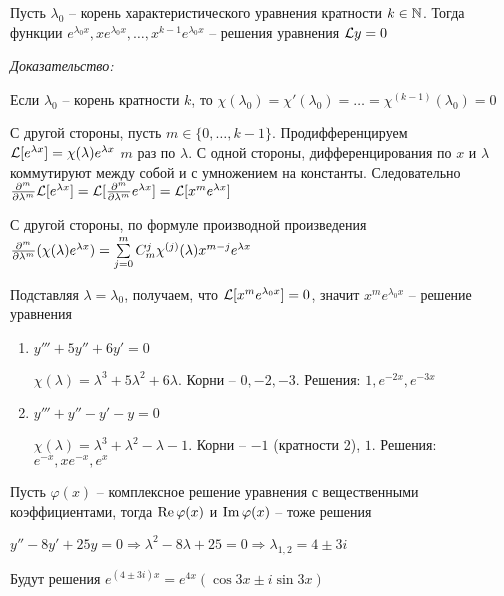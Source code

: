 \documentclass[12pt]{article}
\begin{document}
\begin{theo}{}
    Пусть $\lambda_0$ -- корень характеристического уравнения кратности $k \in \mathbb N$. Тогда функции $e^{\lambda_0x}, xe^{\lambda_0x}, \ldots, x^{k - 1}e^{\lambda_0x}$ -- решения уравнения $\mathcal{L} y = 0$ 
\end{theo}

\textit{Доказательство:}

Если $\lambda_0$ -- корень кратности $k$, то $\chi(\lambda_0) = \chi'(\lambda_0) = \ldots = \chi^{(k - 1)}(\lambda_0) = 0$

С другой стороны, пусть $m \in \{0, \ldots, k - 1\}$. Продифференцируем $\mathcal{L}[e^{\lambda x}] = \chi(\lambda)e^{\lambda x}$ $m$ раз по $\lambda$. С одной стороны, дифференцирования по $x$ и $\lambda$ коммутируют между собой и с умножением на константы. Следовательно $\frac{\partial ^m}{\partial \lambda^m}\mathcal{L}[e^{\lambda x}] = \mathcal{L}[\frac{\partial ^m}{\partial \lambda^m}e^{\lambda x}] = \mathcal{L}[x^me^{\lambda x}]$

С другой стороны, по формуле производной произведения $\frac{\partial ^m}{\partial \lambda^m}(\chi(\lambda)e^{\lambda x}) = \sum\limits_{j = 0}^m C_m^j\chi^{(j)}(\lambda) x^{m - j}e^{\lambda x}$

Подставляя $\lambda = \lambda_0$, получаем, что $\mathcal{L}[x^me^{\lambda_0x}] = 0$, значит $x^me^{\lambda_0x}$ -- решение уравнения

\begin{Example}{}
    \begin{enumerate}
        \item $y''' + 5y'' + 6y' = 0$
        
        $\chi(\lambda) = \lambda^3 + 5\lambda^2 + 6\lambda$. Корни -- $0, -2, -3$. Решения: $1, e^{-2x}, e^{-3x}$

        \item $y''' + y'' - y' - y = 0$
        
        $\chi(\lambda) = \lambda^3 + \lambda^2 - \lambda - 1$. Корни -- $-1$ (кратности 2), $1$. Решения: $e^{-x}, xe^{-x}, e^x$
    \end{enumerate}
\end{Example}

\begin{lem}{}
    Пусть $\varphi(x)$ -- комплексное решение уравнения с вещественными коэффициентами, тогда $\operatorname{Re} \varphi(x)$ и $\operatorname{Im} \varphi(x)$ -- тоже решения 
\end{lem}

\begin{Example}{}
    $y'' - 8y' + 25y = 0 \Rightarrow \lambda^2 - 8\lambda + 25 = 0 \Rightarrow \lambda_{1, 2} = 4 \pm 3i$

    Будут решения $e^{(4 \pm 3i)x} = e^{4x}(\cos 3x \pm i\sin 3x)$ 
\end{Example}
\end{document}
